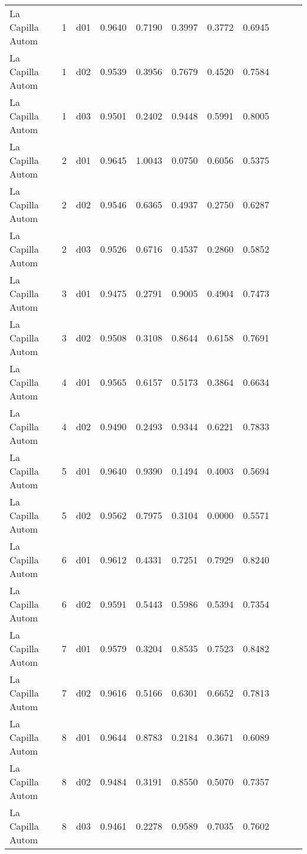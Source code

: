 \begin{landscape}
\begin{longtable}{p{5cm}rrrrrrrrrr}
\bottomrule
\endlastfoot
     La Capilla Autom  & 1 &     d01 &   0.9640 &  0.7190 &    0.3997 &   0.3772 &    0.6945 \\
     La Capilla Autom  & 1 &     d02 &   0.9539 &  0.3956 &    0.7679 &   0.4520 &    0.7584 \\
     La Capilla Autom  & 1 &     d03 &   0.9501 &  0.2402 &    0.9448 &   0.5991 &    0.8005 \\
     La Capilla Autom  & 2 &     d01 &   0.9645 &  1.0043 &    0.0750 &   0.6056 &    0.5375 \\
     La Capilla Autom  & 2 &     d02 &   0.9546 &  0.6365 &    0.4937 &   0.2750 &    0.6287 \\
     La Capilla Autom  & 2 &     d03 &   0.9526 &  0.6716 &    0.4537 &   0.2860 &    0.5852 \\
     La Capilla Autom  & 3 &     d01 &   0.9475 &  0.2791 &    0.9005 &   0.4904 &    0.7473 \\
     La Capilla Autom  & 3 &     d02 &   0.9508 &  0.3108 &    0.8644 &   0.6158 &    0.7691 \\
     La Capilla Autom  & 4 &     d01 &   0.9565 &  0.6157 &    0.5173 &   0.3864 &    0.6634 \\
     La Capilla Autom  & 4 &     d02 &   0.9490 &  0.2493 &    0.9344 &   0.6221 &    0.7833 \\
     La Capilla Autom  & 5 &     d01 &   0.9640 &  0.9390 &    0.1494 &   0.4003 &    0.5694 \\
     La Capilla Autom  & 5 &     d02 &   0.9562 &  0.7975 &    0.3104 &   0.0000 &    0.5571 \\
     La Capilla Autom  & 6 &     d01 &   0.9612 &  0.4331 &    0.7251 &   0.7929 &    0.8240 \\
     La Capilla Autom  & 6 &     d02 &   0.9591 &  0.5443 &    0.5986 &   0.5394 &    0.7354 \\
     La Capilla Autom  & 7 &     d01 &   0.9579 &  0.3204 &    0.8535 &   0.7523 &    0.8482 \\
     La Capilla Autom  & 7 &     d02 &   0.9616 &  0.5166 &    0.6301 &   0.6652 &    0.7813 \\
     La Capilla Autom  & 8 &     d01 &   0.9644 &  0.8783 &    0.2184 &   0.3671 &    0.6089 \\
     La Capilla Autom  & 8 &     d02 &   0.9484 &  0.3191 &    0.8550 &   0.5070 &    0.7357 \\
     La Capilla Autom  & 8 &     d03 &   0.9461 &  0.2278 &    0.9589 &   0.7035 &    0.7602 \\

\end{longtable}
\end{landscape}
